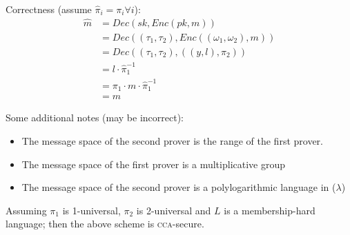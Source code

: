 Correctness (assume $\hat{\pi}_i = \pi_i \forall i$):
\begin{align*}
    \hat{m} &= Dec(sk, Enc(pk, m)) \\
    &= Dec((\tau_1, \tau_2), Enc((\omega_1, \omega_2), m)) \\
    &= Dec((\tau_1, \tau_2), ((y, l), \pi_2)) \\
    &= l \cdot \hat{\pi}_1^{-1} \\
    &= \pi_1 \cdot m \cdot \hat{\pi}_1^{-1} \\
    &= m
\end{align*}

Some additional notes (may be incorrect):
\begin{itemize}
    \item The message space of the second prover is the range of the first prover.
    \item The message space of the first prover is a multiplicative group
    \item The message space of the second prover is a polylogarithmic language in ($\lambda$)
\end{itemize}




\begin{theorem}
    Assuming $\pi_1$ is 1-universal, $\pi_2$ is 2-universal and $L$ is a mem\-bership-hard language; then the above scheme is \textsc{cca}-secure.
\end{theorem}

